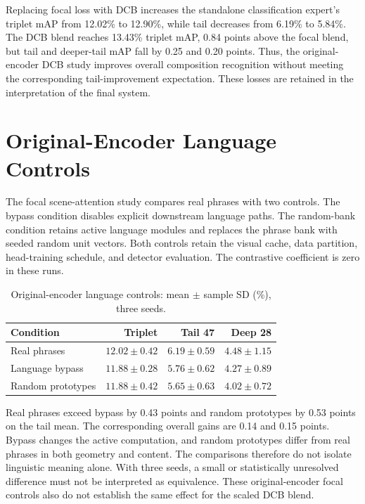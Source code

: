 Replacing focal loss with DCB increases the standalone classification expert's triplet mAP from 12.02\% to 12.90\%, while tail decreases from 6.19\% to 5.84\%. The DCB blend reaches 13.43\% triplet mAP, 0.84 points above the focal blend, but tail and deeper-tail mAP fall by 0.25 and 0.20 points. Thus, the original-encoder DCB study improves overall composition recognition without meeting the corresponding tail-improvement expectation. These losses are retained in the interpretation of the final system.

\section{Original-Encoder Language Controls}

The focal scene-attention study compares real phrases with two controls. The bypass condition disables explicit downstream language paths. The random-bank condition retains active language modules and replaces the phrase bank with seeded random unit vectors. Both controls retain the visual cache, data partition, head-training schedule, and detector evaluation. The contrastive coefficient is zero in these runs.

\begin{table}[htbp]
\centering
\caption{Original-encoder language controls: mean $\pm$ sample SD (\%), three seeds.}
\label{tab:language-controls}
\begin{singlespace}
\begin{tabularx}{\textwidth}{@{}Xrrr@{}}
\toprule
\textbf{Condition} & \textbf{Triplet} & \textbf{Tail 47} & \textbf{Deep 28} \\
\midrule
Real phrases & $12.02\pm0.42$ & $6.19\pm0.59$ & $4.48\pm1.15$ \\
Language bypass & $11.88\pm0.28$ & $5.76\pm0.62$ & $4.27\pm0.89$ \\
Random prototypes & $11.88\pm0.42$ & $5.65\pm0.63$ & $4.02\pm0.72$ \\
\bottomrule
\end{tabularx}
\end{singlespace}
\end{table}

Real phrases exceed bypass by 0.43 points and random prototypes by 0.53 points on the tail mean. The corresponding overall gains are 0.14 and 0.15 points.  Bypass changes the active computation, and random prototypes differ from real phrases in both geometry and content. The comparisons therefore do not isolate linguistic meaning alone. With three seeds, a small or statistically unresolved difference must not be interpreted as equivalence. These original-encoder focal controls also do not establish the same effect for the scaled DCB blend.

